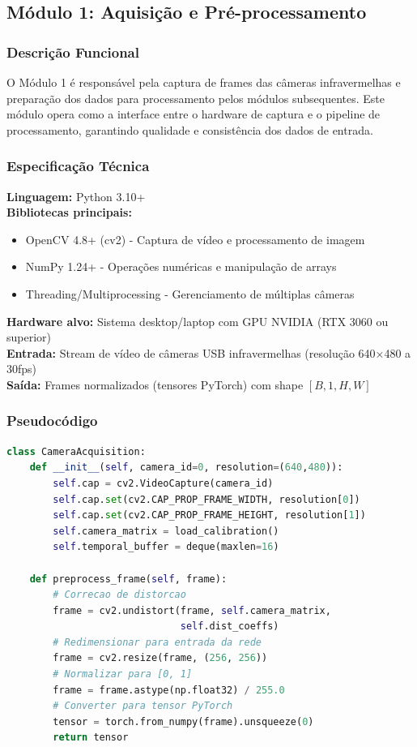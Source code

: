\documentclass[12pt, a4paper]{article}
\begin{document}
\subsection{Módulo 1: Aquisição e Pré-processamento}

\subsubsection{Descrição Funcional}

O Módulo 1 é responsável pela captura de frames das câmeras infravermelhas e preparação dos dados para processamento pelos módulos subsequentes. Este módulo opera como a interface entre o hardware de captura e o pipeline de processamento, garantindo qualidade e consistência dos dados de entrada.

\subsubsection{Especificação Técnica}

\textbf{Linguagem:} Python 3.10+\\
\textbf{Bibliotecas principais:}
\begin{itemize}
    \item OpenCV 4.8+ (cv2) - Captura de vídeo e processamento de imagem
    \item NumPy 1.24+ - Operações numéricas e manipulação de arrays
    \item Threading/Multiprocessing - Gerenciamento de múltiplas câmeras
\end{itemize}

\textbf{Hardware alvo:} Sistema desktop/laptop com GPU NVIDIA (RTX 3060 ou superior)\\
\textbf{Entrada:} Stream de vídeo de câmeras USB infravermelhas (resolução 640×480 a 30fps)\\
\textbf{Saída:} Frames normalizados (tensores PyTorch) com shape $[B, 1, H, W]$

\subsubsection{Pseudocódigo}

\begin{lstlisting}[language=Python, caption=Módulo 1 - Aquisição e Pré-processamento]
class CameraAcquisition:
    def __init__(self, camera_id=0, resolution=(640,480)):
        self.cap = cv2.VideoCapture(camera_id)
        self.cap.set(cv2.CAP_PROP_FRAME_WIDTH, resolution[0])
        self.cap.set(cv2.CAP_PROP_FRAME_HEIGHT, resolution[1])
        self.camera_matrix = load_calibration()
        self.temporal_buffer = deque(maxlen=16)
        
    def preprocess_frame(self, frame):
        # Correcao de distorcao
        frame = cv2.undistort(frame, self.camera_matrix, 
                              self.dist_coeffs)
        # Redimensionar para entrada da rede
        frame = cv2.resize(frame, (256, 256))
        # Normalizar para [0, 1]
        frame = frame.astype(np.float32) / 255.0
        # Converter para tensor PyTorch
        tensor = torch.from_numpy(frame).unsqueeze(0)
        return tensor
\end{lstlisting}
\end{document}
